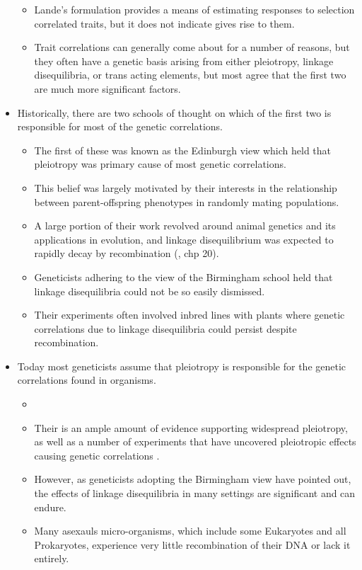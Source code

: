 \documentclass[11pt,one column]{article}
\begin{document}
\begin{itemize}
\begin{itemize}
	\item Lande’s formulation provides a means of estimating responses to selection correlated traits, but it does not indicate gives rise to them.
	\item Trait correlations can generally come about for a number of reasons, but they often have a genetic basis \cite{Saltz2017} arising from either pleiotropy, linkage disequilibria, or trans acting elements, but most agree that the first two are much more significant factors.
	\end{itemize}
\item Historically, there are two schools of thought on which of the first two is responsible for most of the genetic correlations.
	\begin{itemize} 
	\item The first of these was known as the Edinburgh view which held that pleiotropy was primary cause of most genetic correlations.
	\item This belief was largely motivated by their interests in the relationship between parent-offspring phenotypes in randomly mating populations.
	\item A large portion of their work revolved around animal genetics and its applications in evolution, and linkage disequilibrium was expected to rapidly decay by recombination (\cite{fox2006evolutionary}, chp 20).
	\item Geneticists adhering to the view of the Birmingham school held that linkage disequilibria could not be so easily dismissed.  
	\item Their experiments often involved inbred lines with plants where genetic correlations due to linkage disequilibria could persist despite recombination.
	\end{itemize}
\item Today most geneticists assume that pleiotropy is responsible for the genetic correlations found in organisms.
	\begin{itemize}
	\item 
	\item Their is an ample amount of evidence supporting widespread pleiotropy, as well as a number of experiments that have uncovered pleiotropic effects causing genetic correlations \cite{Saltz2017}.
	\item However, as geneticists adopting the Birmingham view have pointed out, the effects of linkage disequilibria in many settings are significant and can endure. 
	\item Many asexauls micro-organisms, which include some Eukaryotes and all Prokaryotes, experience very little recombination of their DNA or lack it entirely.

\end{itemize}
\end{itemize}
\end{document}
